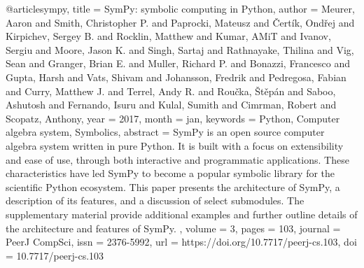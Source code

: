 
@article{sympy,
 title = {SymPy: symbolic computing in Python},
 author = {Meurer, Aaron and Smith, Christopher P. and Paprocki, Mateusz and \v{C}ert\'{i}k, Ond\v{r}ej and Kirpichev, Sergey B. and Rocklin, Matthew and Kumar, AMiT and Ivanov, Sergiu and Moore, Jason K. and Singh, Sartaj and Rathnayake, Thilina and Vig, Sean and Granger, Brian E. and Muller, Richard P. and Bonazzi, Francesco and Gupta, Harsh and Vats, Shivam and Johansson, Fredrik and Pedregosa, Fabian and Curry, Matthew J. and Terrel, Andy R. and Rou\v{c}ka, \v{S}t\v{e}p\'{a}n and Saboo, Ashutosh and Fernando, Isuru and Kulal, Sumith and Cimrman, Robert and Scopatz, Anthony},
 year = 2017,
 month = jan,
 keywords = {Python, Computer algebra system, Symbolics},
 abstract = {
            SymPy is an open source computer algebra system written in pure Python. It is built with a focus on extensibility and ease of use, through both interactive and programmatic applications. These characteristics have led SymPy to become a popular symbolic library for the scientific Python ecosystem. This paper presents the architecture of SymPy, a description of its features, and a discussion of select submodules. The supplementary material provide additional examples and further outline details of the architecture and features of SymPy.
         },
 volume = 3,
 pages = {103},
 journal = {PeerJ CompSci},
 issn = {2376-5992},
 url = {https://doi.org/10.7717/peerj-cs.103},
 doi = {10.7717/peerj-cs.103}
}
